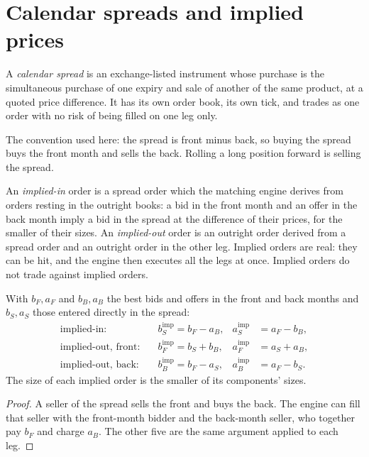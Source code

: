 \section{Calendar spreads and implied prices}

\begin{definition}\label{def:m1:matching-algorithms-and-implied-spreads:calendar}
A \emph{calendar spread} is an exchange-listed
instrument whose purchase is the simultaneous purchase of one expiry and
sale of another of the same product, at a quoted price difference. It has
its own order book, its own tick, and trades as one order with no risk of
being filled on one leg only.
\end{definition}

The convention used here: the spread is front minus back, so buying the
spread buys the front month and sells the back. Rolling a long position
forward is selling the spread.

\begin{definition}\label{def:m1:matching-algorithms-and-implied-spreads:implied}
An \emph{implied-in} order is a spread order which the
matching engine derives from orders resting in the outright books: a bid in
the front month and an offer in the back month imply a bid in the spread at
the difference of their prices, for the smaller of their sizes. An
\emph{implied-out} order is an outright order derived from
a spread order and an outright order in the other leg. Implied orders are
real: they can be hit, and the engine then executes all the legs at once.
Implied orders do not trade against implied orders.
\end{definition}

\begin{proposition}\label{prop:m1:matching-algorithms-and-implied-spreads:implied}
With $b_F, a_F$ and $b_B, a_B$ the best bids and offers in the front and back
months and $b_S, a_S$ those entered directly in the spread:
\begin{align*}
\text{implied-in:}\quad & b_S^{\text{imp}} = b_F - a_B, & a_S^{\text{imp}} &= a_F - b_B,\\
\text{implied-out, front:}\quad & b_F^{\text{imp}} = b_S + b_B, & a_F^{\text{imp}} &= a_S + a_B,\\
\text{implied-out, back:}\quad & b_B^{\text{imp}} = b_F - a_S, & a_B^{\text{imp}} &= a_F - b_S.
\end{align*}
The size of each implied order is the smaller of its components' sizes.
\end{proposition}
\begin{proof}
A seller of the spread sells the front and buys the back. The engine can
fill that seller with the front-month bidder and the back-month seller, who
together pay $b_F$ and charge $a_B$. The other five are the same argument applied
to each leg.
\end{proof}

